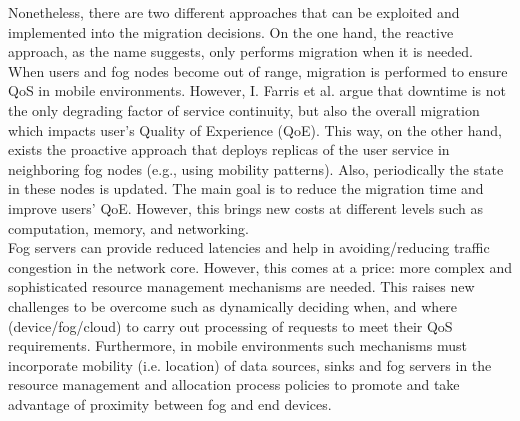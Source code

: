 \noindent\tab Nonetheless, there are two different approaches that can be exploited and implemented into the migration decisions. On the one hand, the reactive approach, as the name suggests, only performs migration when it is needed. When users and fog nodes become out of range, migration is performed to ensure QoS in mobile environments. However, I. Farris et al. \cite{farris2017optimizing} argue that downtime is not the only degrading factor of service continuity, but also the overall migration which impacts user's Quality of Experience (QoE). This way, on the other hand, exists the proactive approach that deploys replicas of the user service in neighboring fog nodes (e.g., using mobility patterns). Also, periodically the state in these nodes is updated. The main goal is to reduce the migration time and improve users' QoE. However, this brings new costs at different levels such as computation, memory, and networking.\\
\noindent\tab Fog servers can provide reduced latencies and help in avoiding/reducing traffic congestion in the network core. However, this comes at a price: more complex and sophisticated resource management mechanisms are needed. This raises new challenges to be overcome such as dynamically deciding when, and where (device/fog/cloud) to carry out processing of requests to meet their QoS requirements. Furthermore, in mobile environments such mechanisms must incorporate mobility (i.e. location) of data sources, sinks and fog servers in the resource management and allocation process policies to promote and take advantage of proximity between fog and end devices.